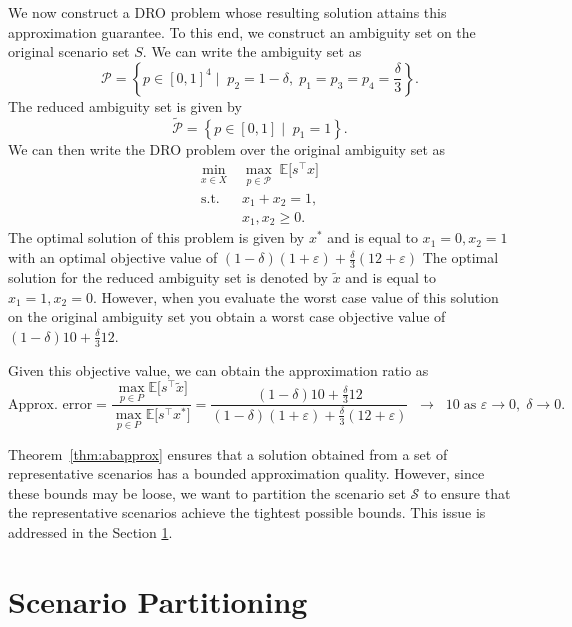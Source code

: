 \documentclass{article}
\newcommand{\mX}{\mathcal{X}}
\newcommand{\mP}{\mathcal{P}}
\newcommand{\mS}{\mathcal{S}}
\newcommand{\R}{\mathbb{R}}
\begin{document}
We now construct a DRO problem whose resulting solution attains this approximation guarantee.
To this end, we construct an ambiguity set on the original scenario set $S$. 
We can write the ambiguity set as
\[
\mathcal{P} = \left\{ p \in [0,1]^4 \mid \;p_2 = 1-\delta,\; p_1=p_3=p_4=\frac{\delta}{3} \right\}.
\]
The reduced ambiguity set is given by 
\[
\tilde{\mathcal{P}} = \left\{ p \in [0,1] \mid \;p_1 = 1 \right\}.
\]
We can then write the DRO problem over the original ambiguity set as
\begin{equation}
\begin{aligned}
\min_{x \in X} &\; \max_{p \in \mP}
\; \mathbb{E}\big[ s^\top x \big]\\
\text{s.t.} &\; x_1 + x_2 = 1,\\
&\; x_1, x_2 \geq 0.
\end{aligned}
\end{equation}
The optimal solution of this problem is given by $x^*$ and is equal to $x_1 = 0, x_2 = 1$ with an optimal objective value of \((1-\delta)(1+\varepsilon) + \frac{\delta}{3}(12 + \varepsilon)\) 
The optimal solution for the reduced ambiguity set is denoted by $\tilde{x}$ and is equal to $x_1 = 1, x_2 = 0$. 
However, when you evaluate the worst case value of this solution on the original ambiguity set you obtain a worst case objective value of $(1-\delta)10 + \frac{\delta}{3}12$.

Given this objective value, we can obtain the approximation ratio as
\[
\text{Approx. error} =
\frac{\displaystyle \max_{p \in P} \mathbb{E}\big[ s^\top \tilde{x} \big]}
     {\displaystyle \max_{p \in P} \mathbb{E}\big[ s^\top x^* \big]}
= \frac{(1-\delta)10 + \frac{\delta}{3}12}{(1-\delta)(1+\varepsilon) + \frac{\delta}{3}(12 + \varepsilon)}
\;\;\longrightarrow\;\; 10 \;\text{as } \varepsilon \to 0,\; \delta \rightarrow 0.
\]

Theorem~\ref{thm:abapprox} ensures that a solution obtained from a set of representative scenarios has a bounded approximation quality.
However, since these bounds may be loose, we want to partition the scenario set \(\mS\) to ensure that the representative scenarios achieve the tightest possible bounds.
This issue is addressed in the Section \ref{sec:scenario_partitions}.

\section{Scenario Partitioning}
\label{sec:scenario_partitions}
\end{document}
